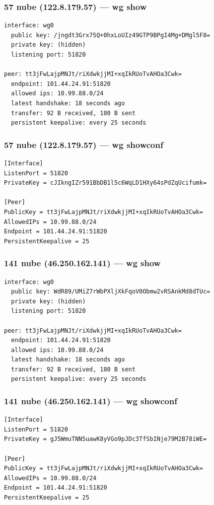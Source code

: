 \documentclass[11pt,a4paper]{article}
\begin{document}
\subsubsection*{57 nube (122.8.179.57) — wg show}
\begin{lstlisting}
interface: wg0
  public key: /jngdt3Grx75Q+0hxLoUIz49GTP9BPgI4Mg+DMgl5F8=
  private key: (hidden)
  listening port: 51820

peer: tt3jFwLajpMNJt/riXdwkjjMI+xqIkRUoTvAHOa3Cwk=
  endpoint: 101.44.24.91:51820
  allowed ips: 10.99.88.0/24
  latest handshake: 18 seconds ago
  transfer: 92 B received, 180 B sent
  persistent keepalive: every 25 seconds

\end{lstlisting}

\subsubsection*{57 nube (122.8.179.57) — wg showconf}
\begin{lstlisting}
[Interface]
ListenPort = 51820
PrivateKey = cJIkngIZr591BbDB1l5c6WqLD1HXy64sPdZqUcifumk=

[Peer]
PublicKey = tt3jFwLajpMNJt/riXdwkjjMI+xqIkRUoTvAHOa3Cwk=
AllowedIPs = 10.99.88.0/24
Endpoint = 101.44.24.91:51820
PersistentKeepalive = 25

\end{lstlisting}

\subsubsection*{141 nube (46.250.162.141) — wg show}
\begin{lstlisting}
interface: wg0
  public key: WdR89/UMiZ7rWbPXljXkFqoV0Obmw2vRSAnkMd8dTUc=
  private key: (hidden)
  listening port: 51820

peer: tt3jFwLajpMNJt/riXdwkjjMI+xqIkRUoTvAHOa3Cwk=
  endpoint: 101.44.24.91:51820
  allowed ips: 10.99.88.0/24
  latest handshake: 18 seconds ago
  transfer: 92 B received, 180 B sent
  persistent keepalive: every 25 seconds

\end{lstlisting}

\subsubsection*{141 nube (46.250.162.141) — wg showconf}
\begin{lstlisting}
[Interface]
ListenPort = 51820
PrivateKey = gJ5WmuTNN5uawK8yVGo9pJDc3TfSbINje79M2B78iWE=

[Peer]
PublicKey = tt3jFwLajpMNJt/riXdwkjjMI+xqIkRUoTvAHOa3Cwk=
AllowedIPs = 10.99.88.0/24
Endpoint = 101.44.24.91:51820
PersistentKeepalive = 25

\end{lstlisting}
\end{document}
